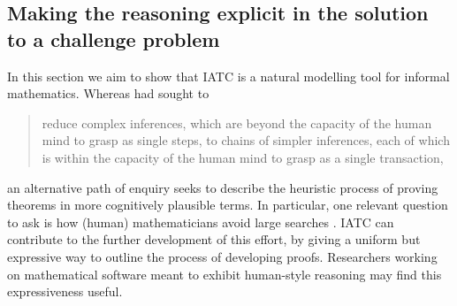 \documentclass[smallextended,oneside]{svjour3}       %
\let\cite\citep
\begin{document}


\subsection{Making the reasoning explicit in the solution to a challenge problem}\label{iatc-examples:gowers}

In this section we aim to show that IATC is a natural modelling
tool for informal mathematics.
Whereas \citet[p.~23]{robinson1965machine} had sought to
\begin{quote}
reduce complex inferences, which are beyond the capacity of the human
mind to grasp as single steps, to chains of simpler inferences, each
of which is within the capacity of the human mind to grasp as a single
transaction,
\end{quote}
an alternative path of enquiry seeks to describe the heuristic process
of proving theorems in more cognitively plausible terms. 
In particular, one relevant question to ask is
how (human) mathematicians avoid large searches \cite{gowers-talk-ini}.
IATC can contribute to the further development of this effort,
by giving a uniform but expressive way to outline the
process of developing proofs.
Researchers working on mathematical software meant to exhibit
human-style reasoning may find this expressiveness useful.
\end{document}
